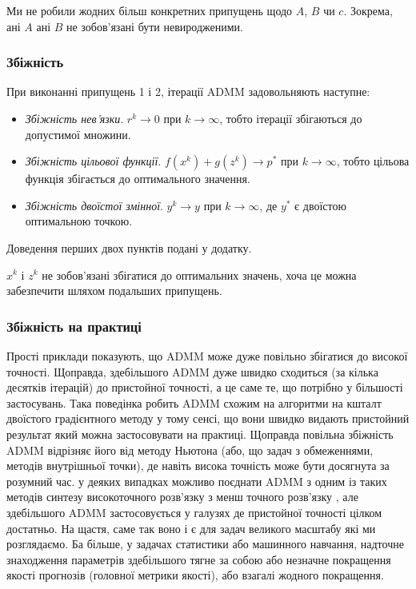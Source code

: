 \begin{remark}
    Ми не робили жодних більш конкретних припущень щодо $A$, $B$ чи $c$. Зокрема, ані $A$ ані $B$ не зобов'язані бути невиродженими. 
\end{remark}

\subsubsection{Збіжність}

\begin{theorem}
	При виконанні припущень 1 і 2, ітерації ADMM задовольняють наступне:
	\begin{itemize}
		\item \textit{Збіжність нев'язки}. $r^k \to 0$ при $k \to \infty$, тобто ітерації збігаються до допустимої множини.
		\item \textit{Збіжність цільової функції}. $f \left( x^k \right) + g \left( z^k \right) \to p^*$ при $k \to \infty$, тобто цільова функція збігається до оптимального значення.
		\item \textit{Збіжність двоїстої змінної}. $y^k \to y$ при $k \to \infty$, де $y^*$ є двоїстою оптимальною точкою.
	\end{itemize}
\end{theorem}

Доведення перших двох пунктів подані у додатку. 

\begin{remark}
    $x^k$ і $z^k$ не зобов'язані збігатися до оптимальних значень, хоча це можна забезпечити шляхом подальших припущень.
\end{remark}

\subsubsection{Збіжність на практиці}

Прості приклади показують, що ADMM може дуже повільно збігатися до високої точності. Щоправда, здебільшого ADMM дуже швидко сходиться (за кілька десятків ітерацій) до пристойної точності, а це саме те, що потрібно у більшості застосувань. Така поведінка робить ADMM схожим на алгоритми на кшталт двоїстого градієнтного методу у тому сенсі, що вони швидко видають пристойний результат який можна застосовувати на практиці. Щоправда повільна збіжність ADMM відрізняє його від методу Ньютона (або, що задач з обмеженнями, методів внутрішньої точки), де навіть висока точність може бути досягнута за розумний час. у деяких випадках можливо поєднати ADMM з одним із таких методів синтезу високоточного розв'язку з менш точного розв'язку \cite{64}, але здебільшого ADMM застосовується у галузях де пристойної точності цілком достатньо. На щастя, саме так воно і є для задач великого масштабу які ми розглядаємо. Ба більше, у задачах статистики або машинного навчання, надточне знаходження параметрів здебільшого тягне за собою або незначне покращення якості прогнозів (головної метрики якості), або взагалі жодного покращення.

